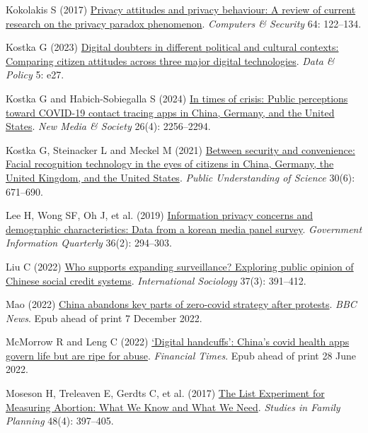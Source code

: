 \documentclass[
  letterpaper,
  DIV=11,
  numbers=noendperiod]{scrartcl}
\newlength{\cslhangindent}
\newenvironment{CSLReferences}[2] %
 {\begin{list}{}{%
  \setlength{\itemindent}{0pt}
  \setlength{\leftmargin}{0pt}
  \setlength{\parsep}{0pt}
  \ifodd #1
   \setlength{\leftmargin}{\cslhangindent}
   \setlength{\itemindent}{-1\cslhangindent}
  \fi
  \setlength{\itemsep}{#2\baselineskip}}}
 {\end{list}}
\begin{document}
\begin{CSLReferences}{1}{1}
Kokolakis S (2017)
\href{https://doi.org/10.1016/j.cose.2015.07.002}{Privacy attitudes and
privacy behaviour: A review of current research on the privacy paradox
phenomenon}. \emph{Computers \& Security} 64: 122--134.

Kostka G (2023) \href{https://doi.org/10.1017/dap.2023.25}{Digital
doubters in different political and cultural contexts: Comparing citizen
attitudes across three major digital technologies}. \emph{Data \&
Policy} 5: e27.

Kostka G and Habich-Sobiegalla S (2024)
\href{https://doi.org/10.1177/14614448221083285}{In times of crisis:
Public perceptions toward COVID-19 contact tracing apps in China,
Germany, and the United States}. \emph{New Media \& Society} 26(4):
2256--2294.

Kostka G, Steinacker L and Meckel M (2021)
\href{https://doi.org/10.1177/09636625211001555}{Between security and
convenience: Facial recognition technology in the eyes of citizens in
China, Germany, the United Kingdom, and the United States}. \emph{Public
Understanding of Science} 30(6): 671--690.

Lee H, Wong SF, Oh J, et al. (2019)
\href{https://doi.org/10.1016/j.giq.2019.01.002}{Information privacy
concerns and demographic characteristics: Data from a korean media panel
survey}. \emph{Government Information Quarterly} 36(2): 294--303.

Liu C (2022) \href{https://doi.org/10.1177/02685809221084446}{Who
supports expanding surveillance? Exploring public opinion of Chinese
social credit systems}. \emph{International Sociology} 37(3): 391--412.

Mao (2022)
\href{https://www.bbc.com/news/world-asia-china-63855508}{China abandons
key parts of zero-covid strategy after protests}. \emph{BBC News}. Epub
ahead of print 7 December 2022.

McMorrow R and Leng C (2022)
\href{https://www.ft.com/content/dee6bcc6-3fc5-4edc-814d-46dc73e67c7e}{{`}Digital
handcuffs{'}: China{'}s covid health apps govern life but are ripe for
abuse}. \emph{Financial Times}. Epub ahead of print 28 June 2022.

Moseson H, Treleaven E, Gerdts C, et al. (2017)
\href{https://doi.org/10.1111/sifp.12042}{The List Experiment for
Measuring Abortion: What We Know and What We Need}. \emph{Studies in
Family Planning} 48(4): 397--405.


\end{CSLReferences}
\end{document}
